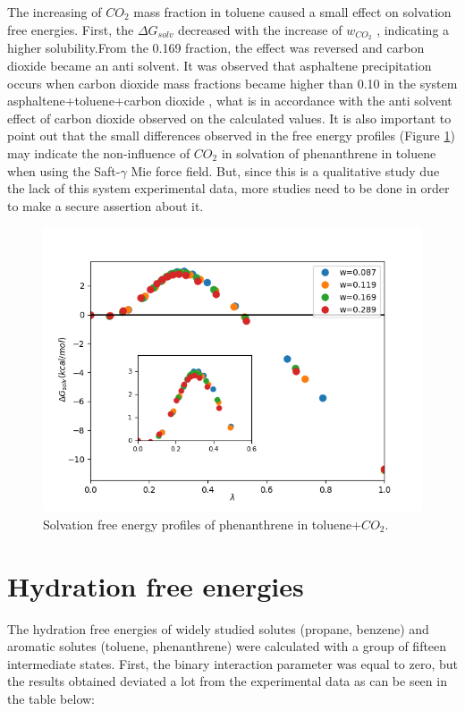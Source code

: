The increasing of $CO_{2}$ mass fraction in toluene caused a small effect on solvation free energies. First, the $\Delta G_{solv}$ decreased with the increase of $w_{CO_{2}}$ , indicating a higher solubility.From the 0.169 fraction, the effect was reversed and carbon dioxide became an anti solvent. It was observed that asphaltene precipitation occurs when carbon dioxide mass fractions became higher than 0.10 in the system asphaltene+toluene+carbon dioxide \cite{SOROUSH2014405}, what is in accordance with the anti solvent effect of carbon dioxide observed on the calculated values. It is also important to point out that the small differences observed in the free energy profiles (Figure \ref{fig:Figure_1}) may indicate the non-influence of $CO_{2}$ in solvation of phenanthrene in toluene when using the Saft-$\gamma$ Mie force field. But, since this is a qualitative study due the lack of this system experimental data, more studies need to be done in order to make a secure assertion about it.   

\begin{figure}[H]
\centering
\includegraphics[width=0.9\linewidth]{Figures/Figure_1}
\caption{Solvation free energy profiles of phenanthrene in toluene+$CO_{2}$.}
\label{fig:Figure_1}
\end{figure}


\section{Hydration free energies}

The hydration free energies of widely studied solutes (propane, benzene) and aromatic solutes (toluene, phenanthrene) were calculated with a group of fifteen intermediate states. First, the binary interaction parameter was equal to zero, but the results obtained deviated a lot from the experimental data as can be seen in the table below:

